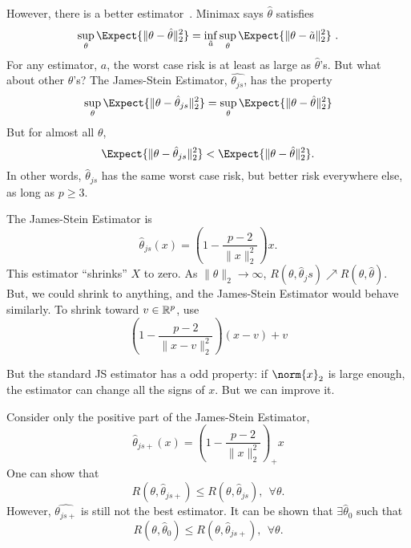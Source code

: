 \documentclass[10pt]{article}
\begin{document}
However, there is a better estimator~\citep{Stein1981,JamesStein1961}.
Minimax says $\hat{\theta}$ satisfies
\begin{equation}
  \sup_{\theta} \Expect{\|\theta-\hat{\theta}\|_2^2} =
  \inf_{\tilde{a}} \sup_{\theta}\Expect{\|\theta-\tilde{a}\|^2_2}\ .
\end{equation}
For any estimator, $a$, the worst case risk is at least as large as $\hat{\theta}$'s.
But what about other $\theta$'s? The James-Stein Estimator,
$\hat{\theta_{js}}$, has the property
\begin{equation}
  \sup_{\theta} \Expect{\|\theta - \hat{\theta}_{js}\|^2_2} = \sup_{\theta} \Expect{
    \| \theta - \hat{\theta} \|^2_2}
\end{equation}
But for almost all $\theta$,
\begin{equation}
  \Expect{\|\theta - \hat{\theta}_{js}\|^2_2} < \Expect{
    \| \theta - \hat{\theta} \|^2_2}.
\end{equation}
In other words, $\hat{\theta}_{js}$ has the same worst case risk, but
better risk everywhere else, as long as $p \geq 3$.

The James-Stein Estimator is
\begin{equation}
  \hat{\theta}_{js}(x) = \left( 1-\frac{p-2}{\|x\|^2_2}\right)x.
\end{equation}
This estimator ``shrinks'' $X$ to zero.  As $\|\theta\|_2
\rightarrow \infty$, $R(\theta, \hat{\theta}_js) \nearrow R(\theta,
\hat{\theta})$. But, we could shrink to anything, and the James-Stein
Estimator would behave similarly. To shrink toward $v\in\mathbb{R}^p$, use
\begin{equation}
  \left(1-\frac{p-2}{\|x-v\|^2_2}\right)(x-v)+v
\end{equation}

But the standard JS estimator has a odd property: if $\norm{x}_2$ is
large enough, the estimator can change all the signs of $x$. But we
can improve it.

Consider only the positive part of the James-Stein Estimator,
\begin{equation}
  \hat{\theta}_{js+}(x) = \left( 1-\frac{p-2}{\|x\|^2_2}\right)_{+}x
\end{equation}
One can show that
\begin{equation}
  R(\theta, \hat{\theta}_{js+}) \leq R(\theta, \hat{\theta}_{js}),\ \ \forall\theta.
\end{equation}
However, $\hat{\theta_{js+}}$ is still not the best estimator.
It can be shown that $\exists \hat{\theta}_0$ such that
\begin{equation}
  R(\theta, \hat{\theta}_0) \leq R(\theta,\hat{\theta}_{js+}),\ \ \forall \theta.
\end{equation}




\end{document}
